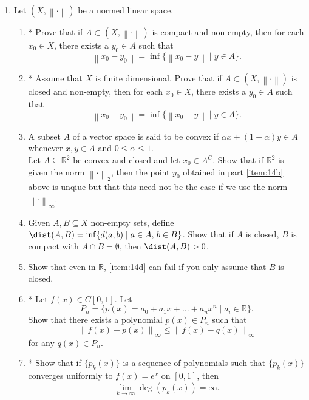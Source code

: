 \documentclass[notoc,notitlepage]{tufte-book}
\newcommand{\norm}[1]{\left\| #1 \right\|}
\begin{document}
\begin{enumerate}
  \item Let $(X, \norm\cdot)$ be a normed linear space.
    \begin{enumerate}
      \item * Prove that if $A \subset (X, \norm\cdot)$ is compact and non-empty, then for each $x_0 \in X$, there exists a $y_0 \in A$ such that
        \begin{equation*}
          \norm{ x_0 - y_0 } = \inf \{ \norm{ x_0 - y } \mid y \in A \}.
        \end{equation*}
      \item * Assume that $X$ is finite dimensional. Prove that if $A \subset (X, \norm\cdot)$ is closed and non-empty, then for each $x_0 \in X$, there exists a $y_0 \in A$ such that \label{item:14b}
        \begin{equation*}
          \norm{ x_0 - y_0 } = \inf \{ \norm{ x_0 - y } \mid y \in A \}.
        \end{equation*}
      \item A subset $A$ of a vector space is said to be convex if $\alpha x + ( 1 - \alpha ) y \in A$ whenever $x, y \in A$ and $0 \leq \alpha \leq 1$. \\
        Let $A \subseteq \mathbb{R}^2$ be convex and closed and let $x_0 \in A^C$. Show that if $\mathbb{R}^2$ is given the norm $\norm\cdot_2$, then the point $y_0$ obtained in part \ref{item:14b} above is unqiue but that this need not be the case if we use the norm $\norm\cdot_\infty$.
      \item Given $A, B \subseteq X$ non-empty sets, define $\dist(A, B) = \inf \{ d(a, b) \mid a \in A, \, b \in B \}$. Show that if $A$ is closed, $B$ is compact with $A \cap B = \emptyset$, then $\dist(A, B) > 0$. \label{item:14d}
      \item Show that even in $\mathbb{R}$, \ref{item:14d} can fail if you only assume that $B$ is closed.
      \item * Let $f(x) \in C[ 0, 1 ]$. Let
        \begin{equation*}P_n = \{ p(x) = a_0 + a_1 x + \hdots + a_n x^n \mid a_i \in \mathbb{R} \}.
        \end{equation*}
        Show that there exists a polynomial $p(x) \in P_n$ such that
        \begin{equation*}
          \norm{ f(x) - p(x) }_\infty \leq \norm{ f(x) - q(x) }_\infty
        \end{equation*}
        for any $q(x) \in P_n$.
      \item * Show that if $\{ p_k(x) \}$ is a sequence of polynomials such that $\{ p_k(x) \}$ converges uniformly to $f(x) = e^x$ on $[0, 1]$, then
        \begin{equation*}
          \lim_{ k \to \infty } \deg (p_k(x)) = \infty.
        \end{equation*}
    \end{enumerate}


\end{enumerate}
\end{document}
